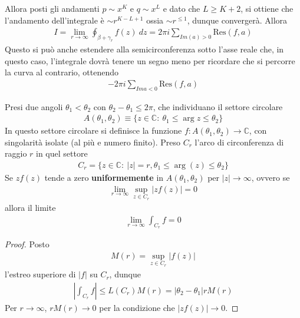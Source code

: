\documentclass[a4paper, oneside]{article}
\begin{document}
Allora posti gli andamenti $p \sim x^{K}$ e $q \sim x^{L}$ e dato che $L \geq K + 2$, si ottiene che 
l'andamento dell'integrale è $\sim r^{K - L + 1}$ ossia $\sim r^{\leq 1}$, dunque convergerà. Allora 
\begin{gather*}
    I = \lim_{r \to \infty } \oint_{\beta + \gamma_r} f(z) \ dz = 2\pi i \sum_{Im(a) > 0 } \text{Res}(f, a)
\end{gather*}
Questo si può anche estendere alla semicirconferenza sotto l'asse reale che, in questo caso, 
l'integrale dovrà tenere un segno meno per ricordare che si percorre la curva al contrario, ottenendo
\begin{gather*}
    -2\pi i \sum_{Im a < 0 } \text{Res}(f, a) 
\end{gather*}

\begin{lemma}
    Presi due angoli $\theta_1 < \theta_2$ con $\theta_2 - \theta_1 \leq 2\pi$, che individuano 
    il settore circolare 
    \begin{gather*}
        A(\theta_1, \theta_2) \equiv \{z \in \mathbb{C} : \ \theta_1 \leq \arg z \leq \theta_2\}
    \end{gather*}
    In questo settore circolare si definisce la funzione $f : A(\theta_1, \theta_2) \to \mathbb{C}$, con singolarità isolate 
    (al più e numero finito). Preso $C_r$ l'arco di circonferenza di raggio $r$ in quel settore
    \begin{gather*}
        C_r = \{z \in \mathbb{C} : \ \left| z \right| = r, \theta_1 \leq \arg(z) \leq \theta_2 \}
    \end{gather*}
    Se $zf(z)$ tende a zero \textbf{uniformemente} in $A(\theta_1, \theta_2)$ per $\left| z \right| \to \infty$, ovvero se
    \begin{gather*}
        \lim_{r \to \infty } \sup_{z \in C_r} \left| z f(z)\right|  = 0
    \end{gather*}  
    allora il limite 
    \begin{gather*}
        \lim_{r \to \infty } \int_{C_r}^{} f = 0  
    \end{gather*}
\end{lemma}
\begin{proof}
    Posto
    \begin{gather*}
        M(r) = \sup_{z \in C_r} \left| f(z) \right|  
    \end{gather*}
    l'estreo superiore di $|f|$ su $C_r$, dunque 
    \begin{gather*}
        \left| \int_{C_r} f\right|   \leq L(C_r)M(r) = \left| \theta_2 - \theta_1 \right|rM(r ) 
    \end{gather*}
    Per $r \to \infty$, $rM(r) \to 0$ per la condizione che $\left| zf(z) \right| \to 0$.  
\end{proof}
\end{document}
